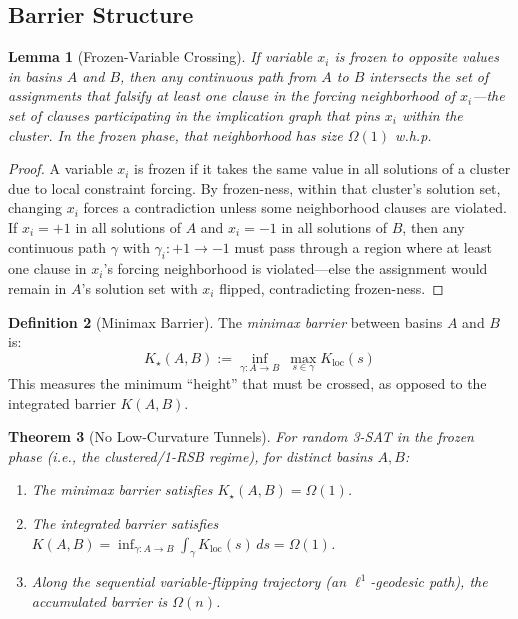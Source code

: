 \documentclass[11pt,a4paper]{article}
\theoremstyle{plain}
\newtheorem{theorem}{Theorem}[section]
\newtheorem{lemma}[theorem]{Lemma}
\theoremstyle{definition}
\newtheorem{definition}[theorem]{Definition}
\theoremstyle{remark}
\begin{document}
\subsection{Barrier Structure}

\begin{lemma}[Frozen-Variable Crossing]
\label{lem:frozen-crossing}
If variable $x_i$ is frozen to opposite values in basins $A$ and $B$, then any continuous path from $A$ to $B$ intersects the set of assignments that falsify at least one clause in the \emph{forcing neighborhood} of $x_i$---the set of clauses participating in the implication graph that pins $x_i$ within the cluster. In the frozen phase, that neighborhood has size $\Omega(1)$ w.h.p.
\end{lemma}

\begin{proof}
A variable $x_i$ is frozen if it takes the same value in all solutions of a cluster due to local constraint forcing. By frozen-ness, within that cluster's solution set, changing $x_i$ forces a contradiction unless some neighborhood clauses are violated. If $x_i = +1$ in all solutions of $A$ and $x_i = -1$ in all solutions of $B$, then any continuous path $\gamma$ with $\gamma_i: +1 \to -1$ must pass through a region where at least one clause in $x_i$'s forcing neighborhood is violated---else the assignment would remain in $A$'s solution set with $x_i$ flipped, contradicting frozen-ness.
\end{proof}

\begin{definition}[Minimax Barrier]
\label{def:minimax}
The \emph{minimax barrier} between basins $A$ and $B$ is:
\begin{equation}
    K_\star(A,B) := \inf_{\gamma:A\to B}\ \max_{s\in\gamma} K_{\mathrm{loc}}(s)
\end{equation}
This measures the minimum ``height'' that must be crossed, as opposed to the integrated barrier $K(A,B)$.
\end{definition}

\begin{theorem}[No Low-Curvature Tunnels]
\label{thm:no-tunnels}
For random 3-SAT in the frozen phase (i.e., the clustered/1-RSB regime), for distinct basins $A,B$:
\begin{enumerate}
    \item The minimax barrier satisfies $K_\star(A,B) = \Omega(1)$.
    \item The integrated barrier satisfies $K(A, B) = \inf_{\gamma: A \to B} \int_\gamma K_{\text{loc}}(s) \, ds = \Omega(1)$.
    \item Along the sequential variable-flipping trajectory (an $\ell^1$-geodesic path), the accumulated barrier is $\Omega(n)$.
\end{enumerate}
\end{theorem}
\end{document}
